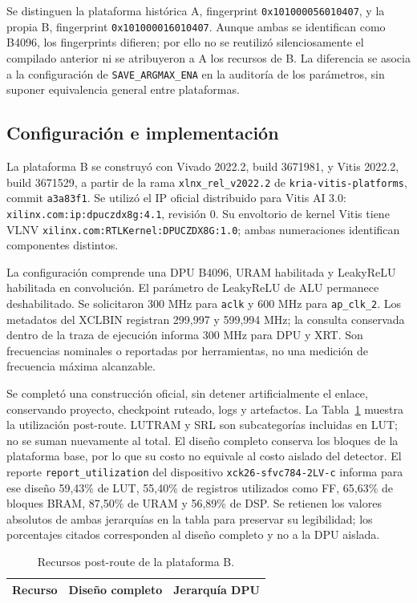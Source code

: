 \documentclass[10pt,conference,a4paper]{elektron}
\newcommand{\fpA}{\texttt{0x101000056010407}}
\newcommand{\fpB}{\texttt{0x101000016010407}}
\begin{document}
Se distinguen la plataforma histórica A, fingerprint \fpA, y la propia B, fingerprint \fpB. Aunque ambas se identifican como B4096, los fingerprints difieren; por ello no se reutilizó silenciosamente el compilado anterior ni se atribuyeron a A los recursos de B. La diferencia se asocia a la configuración de \texttt{SAVE\_ARGMAX\_ENA} en la auditoría de los parámetros, sin suponer equivalencia general entre plataformas.

\subsection{Configuración e implementación}
La plataforma B se construyó con Vivado 2022.2, build 3671981, y Vitis 2022.2, build 3671529, a partir de la rama \texttt{xlnx\_rel\_v2022.2} de \texttt{kria-vitis-platforms}, commit \texttt{a3a83f1}. Se utilizó el IP oficial distribuido para Vitis AI 3.0: \texttt{xilinx.com:ip:dpuczdx8g:4.1}, revisión 0. Su envoltorio de kernel Vitis tiene VLNV \nolinkurl{xilinx.com:RTLKernel:DPUCZDX8G:1.0}; ambas numeraciones identifican componentes distintos.

La configuración comprende una DPU B4096, URAM habilitada y LeakyReLU habilitada en convolución. El parámetro de LeakyReLU de ALU permanece deshabilitado. Se solicitaron 300 MHz para \texttt{aclk} y 600 MHz para \texttt{ap\_clk\_2}. Los metadatos del XCLBIN registran 299,997 y 599,994 MHz; la consulta conservada dentro de la traza de ejecución informa 300 MHz para DPU y XRT. Son frecuencias nominales o reportadas por herramientas, no una medición de frecuencia máxima alcanzable.

Se completó una construcción oficial, sin detener artificialmente el enlace, conservando proyecto, checkpoint ruteado, logs y artefactos. La Tabla~\ref{tab:resources} muestra la utilización post-route. LUTRAM y SRL son subcategorías incluidas en LUT; no se suman nuevamente al total. El diseño completo conserva los bloques de la plataforma base, por lo que su costo no equivale al costo aislado del detector. El reporte \texttt{report\_utilization} del dispositivo \nolinkurl{xck26-sfvc784-2LV-c} informa para ese diseño 59,43\% de LUT, 55,40\% de registros utilizados como FF, 65,63\% de bloques BRAM, 87,50\% de URAM y 56,89\% de DSP. Se retienen los valores absolutos de ambas jerarquías en la tabla para preservar su legibilidad; los porcentajes citados corresponden al diseño completo y no a la DPU aislada.

\begin{table}[t]
\caption{Recursos post-route de la plataforma B.}\label{tab:resources}
\centering\small\begin{tabular}{lrr}\toprule
Recurso & Diseño completo & Jerarquía DPU\\\midrule
\bottomrule\end{tabular}
\end{table}
\end{document}
